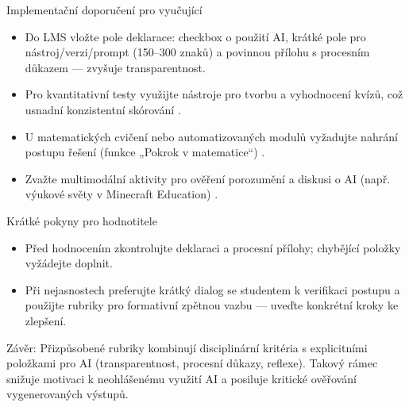 Implementační doporučení pro vyučující
\begin{itemize}
\item Do LMS vložte pole deklarace: checkbox o použití AI, krátké pole pro nástroj/verzi/prompt (150–300 znaků) a povinnou přílohu s procesním důkazem — zvyšuje transparentnost.
\item Pro kvantitativní testy využijte nástroje pro tvorbu a vyhodnocení kvízů, což usnadní konzistentní skórování \cite{kb_ai_101_tipu_pdf_page_36_1}.
\item U matematických cvičení nebo automatizovaných modulů vyžadujte nahrání postupu řešení (funkce „Pokrok v matematice“) \cite{kb_ai_101_tipu_pdf_page_8_1}.
\item Zvažte multimodální aktivity pro ověření porozumění a diskusi o AI (např. výukové světy v Minecraft Education) \cite{kb_ai_101_tipu_pdf_page_15_2}.
\end{itemize}

Krátké pokyny pro hodnotitele
\begin{itemize}
\item Před hodnocením zkontrolujte deklaraci a procesní přílohy; chybějící položky vyžádejte doplnit.
\item Při nejasnostech preferujte krátký dialog se studentem k verifikaci postupu a použijte rubriky pro formativní zpětnou vazbu — uveďte konkrétní kroky ke zlepšení.
\end{itemize}

Závěr: Přizpůsobené rubriky kombinují disciplinární kritéria s explicitními položkami pro AI (transparentnost, procesní důkazy, reflexe). Takový rámec snižuje motivaci k neohlášenému využití AI a posiluje kritické ověřování vygenerovaných výstupů.